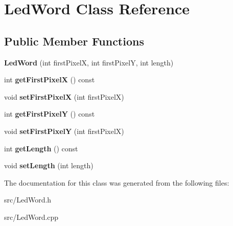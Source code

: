 \hypertarget{class_led_word}{}\section{Led\+Word Class Reference}
\label{class_led_word}
\subsection*{Public Member Functions}
\begin{DoxyCompactItemize}
\item 
\mbox{\label{class_led_word_a3be466e30df512d7d4baf1e48819df48}} 
{\bfseries Led\+Word} (int first\+PixelX, int first\+PixelY, int length)
\item 
\mbox{\label{class_led_word_adb0caa32752f9d86c7a2b40baaf7b8b2}} 
int {\bfseries get\+First\+PixelX} () const
\item 
\mbox{\label{class_led_word_aa90a6ff178e09029cf8ab8b206d3872c}} 
void {\bfseries set\+First\+PixelX} (int first\+PixelX)
\item 
\mbox{\label{class_led_word_ab8c7b9c8e218b3b0f9aabfd2a0134679}} 
int {\bfseries get\+First\+PixelY} () const
\item 
\mbox{\label{class_led_word_a240f0b27e0ad573ae91bbd036213ad25}} 
void {\bfseries set\+First\+PixelY} (int first\+PixelX)
\item 
\mbox{\label{class_led_word_a5c3b00f43585783fa56a4c2d2fc1eb41}} 
int {\bfseries get\+Length} () const
\item 
\mbox{\label{class_led_word_a5f7dbc94bd68492b0e4f2340d3d0421f}} 
void {\bfseries set\+Length} (int length)
\end{DoxyCompactItemize}


The documentation for this class was generated from the following files\+:\begin{DoxyCompactItemize}
\item 
src/Led\+Word.\+h\item 
src/Led\+Word.\+cpp\end{DoxyCompactItemize}
